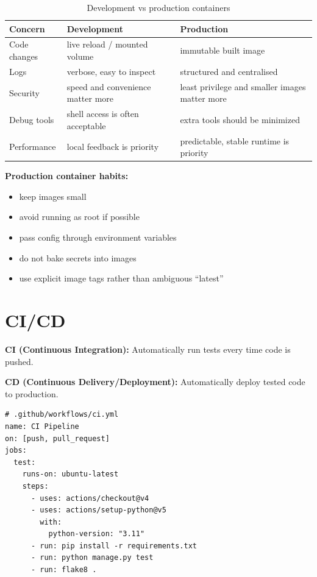 \documentclass[12pt, a4paper, oneside]{book}
\begin{document}
\begin{table}[H]
\centering
\begin{tabular}{|p{}|p{}|p{}|}
\hline
\textbf{Concern} & \textbf{Development} & \textbf{Production} \\
\hline
Code changes & live reload / mounted volume & immutable built image \\
\hline
Logs & verbose, easy to inspect & structured and centralised \\
\hline
Security & speed and convenience matter more & least privilege and smaller images matter more \\
\hline
Debug tools & shell access is often acceptable & extra tools should be minimized \\
\hline
Performance & local feedback is priority & predictable, stable runtime is priority \\
\hline
\end{tabular}
\caption{Development vs production containers}
\end{table}

\textbf{Production container habits:}
\begin{itemize}[leftmargin=2em]
    \item keep images small
    \item avoid running as root if possible
    \item pass config through environment variables
    \item do not bake secrets into images
    \item use explicit image tags rather than ambiguous ``latest''
\end{itemize}

\section{CI/CD}

\textbf{CI (Continuous Integration):} Automatically run tests every time code is pushed.

\textbf{CD (Continuous Delivery/Deployment):} Automatically deploy tested code to production.

\begin{lstlisting}[caption={GitHub Actions CI pipeline}]
# .github/workflows/ci.yml
name: CI Pipeline
on: [push, pull_request]
jobs:
  test:
    runs-on: ubuntu-latest
    steps:
      - uses: actions/checkout@v4
      - uses: actions/setup-python@v5
        with:
          python-version: "3.11"
      - run: pip install -r requirements.txt
      - run: python manage.py test
      - run: flake8 .
\end{lstlisting}
\end{document}
